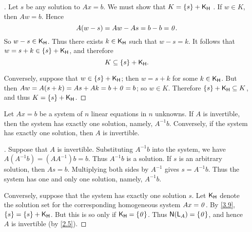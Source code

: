 \begin{proof}[]
  Let \(s\) be any solution to \(Ax = b\).
  We must show that \(K = \left\lbrace s\right\rbrace + \mathsf{K}_{\mathsf{H}}\) .
  If \(w \in K\), then \(Aw = b\).
  Hence
  \[
    A(w - s) = Aw - As = b - b = \mathit{0}.
  \]
  So \(w - s \in \mathsf{K}_{\mathsf{H}}\).
  Thus there exists \(k \in \mathsf{K}_{\mathsf{H}}\) such that \(w - s = k\).
  It follows that \(w = s + k \in \left\lbrace s\right\rbrace + \mathsf{K}_{\mathsf{H}}\), and therefore
  \[
    K \subseteq \left\lbrace s\right\rbrace + \mathsf{K}_{\mathsf{H}}.
  \]

  Conversely, suppose that \(w \in \left\lbrace s\right\rbrace + \mathsf{K}_{\mathsf{H}}\);
  then \(w = s + k\) for some \(k \in \mathsf{K}_{\mathsf{H}}\).
  But then \(Aw = A(s + k) = As + Ak = b + \mathit{0} = b\);
  so \(w \in K\).
  Therefore \(\left\lbrace s\right\rbrace + \mathsf{K}_{\mathsf{H}} \subseteq K\), and thus \(K = \left\lbrace s\right\rbrace + \mathsf{K}_{\mathsf{H}}\).
\end{proof}

\begin{thm}\label{3.10}
  Let \(Ax = b\) be a system of \(n\) linear equations in \(n\) unknowns.
  If \(A\) is invertible, then the system has exactly one solution, namely, \(A^{-1} b\).
  Conversely, if the system has exactly one solution, then \(A\) is invertible.
\end{thm}

\begin{proof}[]
  Suppose that \(A\) is invertible.
  Substituting \(A^{-1} b\) into the system, we have \(A (A^{-1} b) = (A A^{-1}) b = b\).
  Thus \(A^{-1} b\) is a solution.
  If \(s\) is an arbitrary solution, then \(As = b\).
  Multiplying both sides by \(A^{-1}\) gives \(s = A^{-1} b\).
  Thus the system has one and only one solution, namely, \(A^{-1} b\).

  Conversely, suppose that the system has exactly one solution \(s\).
  Let \(\mathsf{K}_{\mathsf{H}}\) denote the solution set for the corresponding homogeneous system \(Ax = \mathit{0}\).
  By \cref{3.9}, \(\left\lbrace s\right\rbrace = \left\lbrace s\right\rbrace + \mathsf{K}_{\mathsf{H}}\).
  But this is so only if \(\mathsf{K}_{\mathsf{H}} = \left\lbrace\mathit{0}\right\rbrace\).
  Thus \(\ns{\L_A} = \set{\zv}\), and hence \(A\) is invertible (by \cref{2.5}).
\end{proof}
